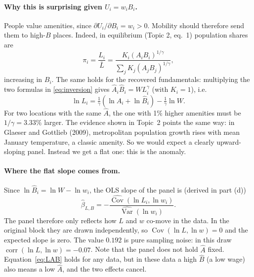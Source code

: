 \documentclass[11pt,a4paper]{article}
\begin{document}
\paragraph{Why this is surprising given $U_i = w_i B_i$.}
People value amenities, since $\partial U_i/\partial B_i = w_i > 0$. Mobility should therefore send them to high-$B$ places. Indeed, in equilibrium (Topic 2, eq.~1) population shares are
\begin{equation}
    \pi_i = \frac{L_i}{\bar L} = \frac{K_i (A_i B_i)^{1/\gamma}}{\sum_j K_j (A_j B_j)^{1/\gamma}},
\end{equation}
increasing in $B_i$. The same holds for the recovered fundamentals: multiplying the two formulas in \eqref{eq:inversion} gives $\hat A_i \hat B_i = W L_i^{\gamma}$ (with $K_i=1$), i.e.
\begin{equation}
    \ln L_i = \tfrac{1}{\gamma}\left(\ln \hat A_i + \ln \hat B_i\right) - \tfrac{1}{\gamma}\ln W .
    \label{eq:LAB}
\end{equation}
For two locations with the same $\hat A$, the one with 1\% higher amenities must be $1/\gamma = 3.33\%$ larger. The evidence shown in Topic~2 points the same way: in Glaeser and Gottlieb (2009), metropolitan population growth rises with mean January temperature, a classic amenity. So we would expect a clearly upward-sloping panel. Instead we get a flat one: this is the anomaly.

\paragraph{Where the flat slope comes from.}
Since $\ln \hat B_i = \ln W - \ln w_i$, the OLS slope of the panel is (derived in part (d))
\begin{equation}
    \hat\beta_{L,B} = -\frac{\widehat{\operatorname{Cov}}(\ln L_i, \ln w_i)}{\widehat{\operatorname{Var}}(\ln w_i)} .
    \label{eq:slope}
\end{equation}
The panel therefore only reflects how $L$ and $w$ co-move in the data. In the original block they are drawn independently, so $\operatorname{Cov}(\ln L, \ln w) = 0$ and the expected slope is zero. The value $0.192$ is pure sampling noise: in this draw $\operatorname{corr}(\ln L, \ln w) = -0.07$. Note that the panel does not hold $\hat A$ fixed. Equation~\eqref{eq:LAB} holds for any data, but in these data a high $\hat B$ (a low wage) also means a low $\hat A$, and the two effects cancel.

\end{document}
